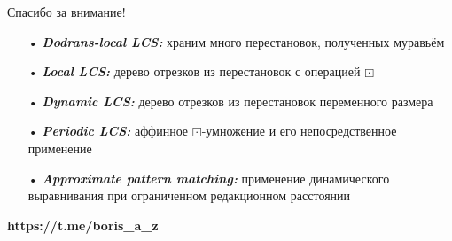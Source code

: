 \documentclass[svgnames]{beamer}
\begin{document}
\begin{frame}{Спасибо за внимание!}
\vspace{-2mm}

\begin{itemize}
  \item[•] {\bfseries\itshape Dodrans-local LCS:} храним много перестановок, полученных муравьём
  \item[•] {\bfseries\itshape Local LCS:} дерево отрезков из перестановок с операцией \(\boxdot\)
  \item[•] {\bfseries\itshape Dynamic LCS:} дерево отрезков из перестановок переменного размера
  \item[•] {\bfseries\itshape Periodic LCS:} аффинное \(\boxdot\)-умножение и его непосредственное применение 
  \item[•] {\bfseries\itshape Approximate pattern matching:} применение динамического выравнивания при ограниченном редакционном расстоянии
\end{itemize} \vspace{1.5mm}

\begin{center}
  \bf https://t.me/boris\_a\_z
\end{center}

\end{frame}
\end{document}
